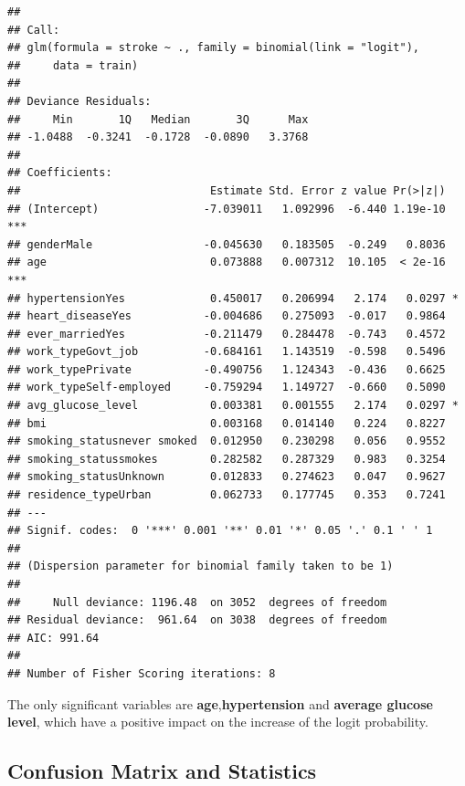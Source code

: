 \documentclass[
]{article}
\begin{document}
\begin{verbatim}
## 
## Call:
## glm(formula = stroke ~ ., family = binomial(link = "logit"), 
##     data = train)
## 
## Deviance Residuals: 
##     Min       1Q   Median       3Q      Max  
## -1.0488  -0.3241  -0.1728  -0.0890   3.3768  
## 
## Coefficients:
##                             Estimate Std. Error z value Pr(>|z|)    
## (Intercept)                -7.039011   1.092996  -6.440 1.19e-10 ***
## genderMale                 -0.045630   0.183505  -0.249   0.8036    
## age                         0.073888   0.007312  10.105  < 2e-16 ***
## hypertensionYes             0.450017   0.206994   2.174   0.0297 *  
## heart_diseaseYes           -0.004686   0.275093  -0.017   0.9864    
## ever_marriedYes            -0.211479   0.284478  -0.743   0.4572    
## work_typeGovt_job          -0.684161   1.143519  -0.598   0.5496    
## work_typePrivate           -0.490756   1.124343  -0.436   0.6625    
## work_typeSelf-employed     -0.759294   1.149727  -0.660   0.5090    
## avg_glucose_level           0.003381   0.001555   2.174   0.0297 *  
## bmi                         0.003168   0.014140   0.224   0.8227    
## smoking_statusnever smoked  0.012950   0.230298   0.056   0.9552    
## smoking_statussmokes        0.282582   0.287329   0.983   0.3254    
## smoking_statusUnknown       0.012833   0.274623   0.047   0.9627    
## residence_typeUrban         0.062733   0.177745   0.353   0.7241    
## ---
## Signif. codes:  0 '***' 0.001 '**' 0.01 '*' 0.05 '.' 0.1 ' ' 1
## 
## (Dispersion parameter for binomial family taken to be 1)
## 
##     Null deviance: 1196.48  on 3052  degrees of freedom
## Residual deviance:  961.64  on 3038  degrees of freedom
## AIC: 991.64
## 
## Number of Fisher Scoring iterations: 8
\end{verbatim}

The only significant variables are \textbf{age},\textbf{hypertension}
and \textbf{average glucose level}, which have a positive impact on the
increase of the logit probability.

\subsection{Confusion Matrix and Statistics}
\end{document}
